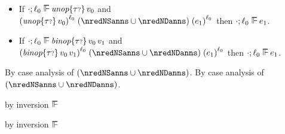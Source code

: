 \begin{lemma}\label{H-delta-label-preservation}\leavevmode
  \begin{itemize}
    \item
      If\/ $\snil; \sowner_0 \sWSOP \eunopt{\stoptional}{\svalue_0}$
      and\/ $\obars{\eunopt{\stoptional}{\svalue_0}}{\sowner_0} \nredNXanns \obars{\sexpr_1}{\sowner_0}$
      then\/ $\snil; \sowner_0 \sWSOP \sexpr_1$.
    \item
      If\/ $\snil; \sowner_0 \sWSOP \ebinopt{\stoptional}{\svalue_0}{\svalue_1}$
      and\/ $\obars{\ebinopt{\stoptional}{\svalue_0}{\svalue_1}}{\sowner_0} \nredNXanns \obars{\sexpr_1}{\sowner_0}$
      then\/ $\snil; \sowner_0 \sWSOP \sexpr_1$.
  \end{itemize}
\end{lemma}{
\newcommand{\shortproof}{By case analysis of $\nredNXanns$.}
\begin{lamportproof*}
  \shortproof
\mainproof
  \shortproof

    \begin{pfproof}
        \begin{pfproof}
          by inversion $\sWSOP$
        \end{pfproof}
      \qedstep
    \end{pfproof}

    \begin{pfproof}
        \begin{pfproof}
          by inversion $\sWSOP$
        \end{pfproof}
      \qedstep
    \end{pfproof}

    \begin{pfproof}
      \qedstep
    \end{pfproof}

    \begin{pfproof}
      \qedstep
    \end{pfproof}

    \begin{pfproof}
      \qedstep
    \end{pfproof}

\end{lamportproof*}}


